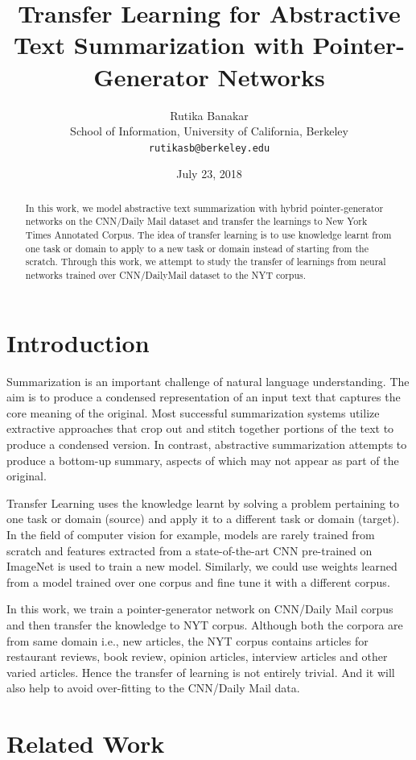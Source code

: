 \documentclass[11pt,a4paper]{article}
\title{Transfer Learning for Abstractive Text Summarization with Pointer-Generator Networks}
\author{Rutika Banakar \\
 School of Information, University of California, Berkeley \\
 {\tt rutikasb@berkeley.edu} \\}
\date{July 23, 2018}
\begin{document}
\maketitle
\begin{abstract}
  In this work, we model abstractive text summarization with hybrid pointer-generator networks on the CNN/Daily Mail dataset and transfer the learnings to New York Times Annotated Corpus. The idea of transfer learning is to use knowledge learnt from one task or domain to apply to a new task or domain instead of starting from the scratch. Through this work, we attempt to study the transfer of learnings from neural networks trained over CNN/DailyMail dataset to the NYT corpus.
\end{abstract}

\section{Introduction}

Summarization is an important challenge of natural language understanding. The aim is to produce a condensed representation of an input text that captures the core meaning of the original. Most successful summarization systems utilize extractive approaches that crop out and stitch together portions of the text to produce a condensed version. In contrast, abstractive summarization attempts to produce a bottom-up summary, aspects of which may not appear as part of the original.

Transfer Learning uses the knowledge learnt by solving a problem pertaining to one task or domain (source) and apply it to a different task or domain (target). In the field of computer vision for example, models are rarely trained from scratch and features extracted from a state-of-the-art CNN pre-trained on ImageNet is used to train a new model. Similarly, we could use weights learned from a model trained over one corpus and fine tune it with a different corpus.

In this work, we train a pointer-generator network on CNN/Daily Mail corpus and then transfer the knowledge to NYT corpus. Although both the corpora are from same domain i.e., new articles, the NYT corpus contains articles for restaurant reviews, book review, opinion articles, interview articles and other varied articles. Hence the transfer of learning is not entirely trivial. And it will also help to avoid over-fitting to the CNN/Daily Mail data.

\section{Related Work}
 
\end{document}
